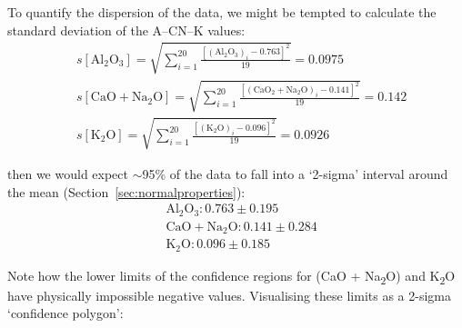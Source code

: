 To quantify the dispersion of the data, we might be tempted to
calculate the standard deviation of the A--CN--K values:
\[
\begin{split}
  &s[\mbox{Al}_2\mbox{O}_3] =
  \sqrt{\sum\limits_{i=1}^{20}
    \frac{\left[(\mbox{Al}_2\mbox{O}_3)_i - 0.763\right]^2}{19}} = 0.0975 \\
  &s[\mbox{CaO} + \mbox{Na}_2\mbox{O}] =
  \sqrt{\sum\limits_{i=1}^{20}
    \frac{\left[(\mbox{CaO}_2+\mbox{Na}_2\mbox{O})_i - 0.141\right]^2}{19} } = 0.142 \\
  &s[\mbox{K}_2\mbox{O}] =
  \sqrt{\sum\limits_{i=1}^{20}
    \frac{\left[(\mbox{K}_2\mbox{O})_i - 0.096\right]^2}{19}} = 0.0926
\end{split}
\]

\noindent then we would expect $\sim$95\% of the data to fall into a
`2-sigma' interval around the mean
(Section~\ref{sec:normalproperties}):
\[
\begin{split}
  &\mbox{Al}_2\mbox{O}_3: 0.763 \pm 0.195 \\
  &\mbox{CaO} + \mbox{Na}_2\mbox{O}: 0.141 \pm 0.284 \\
  &\mbox{K}_2\mbox{O}: 0.096 \pm 0.185
\end{split}
\]

Note how the lower limits of the confidence regions for (CaO +
Na\textsubscript{2}O) and K\textsubscript{2}O have physically
impossible negative values. Visualising these limits as a 2-sigma
`confidence polygon':

